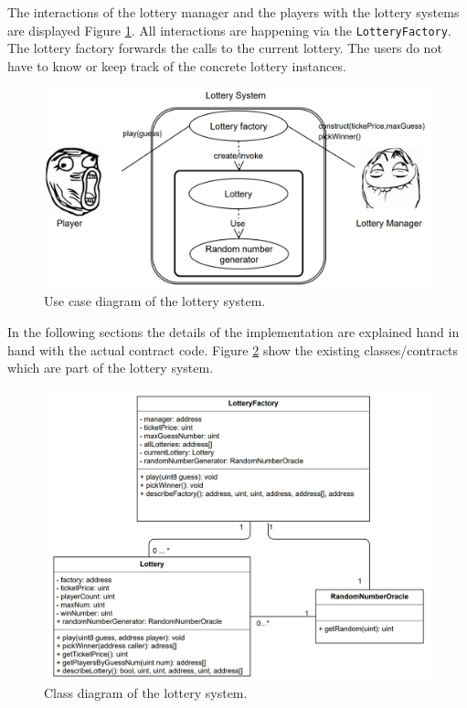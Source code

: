 The interactions of the lottery manager and the players with the lottery
systems are displayed Figure \ref{fig:use_case}. All interactions are happening
via the \texttt{LotteryFactory}. The lottery factory forwards the calls to the
current lottery. The users do not have to know or keep track of the concrete
lottery instances.

\begin{figure}[ht]
  \includegraphics[width=\linewidth]{use_case.jpeg}
  \caption{Use case diagram of the lottery system.}
  \label{fig:use_case}
\end{figure}

In the following sections the details of the implementation are explained hand in hand
with the actual contract code. Figure \ref{fig:class_diagram} show the existing
classes/contracts which are part of the lottery system.

\begin{figure}[ht]
  \includegraphics[width=\linewidth]{class_diagram.jpeg}
  \caption{Class diagram of the lottery system.}
  \label{fig:class_diagram}
\end{figure}


